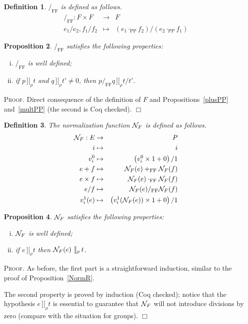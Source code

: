 \documentclass{article}
\newtheorem{definition}{Definition}[section]
\newtheorem{proposition}[definition]{Proposition}
\newenvironment{proof}{\smallskip\textsc{Proof.}}{\hspace*{\fill}$\Box$}
\newcommand{\intII}{\,]\![}
\newcommand{\intrel}{\mathbin{\intII_{\rho}}}
\newcommand{\NF}{\ensuremath{{\cal N}_{F}}}
\newcommand{\multPP}{\ensuremath{\cdot_{\mathrm{PP}}}}
\newcommand{\plusFF}{\ensuremath{+_{\mathrm{FF}}}}
\newcommand{\multFF}{\ensuremath{\cdot_{\mathrm{FF}}}}
\newcommand{\divFF}{\ensuremath{/_{\mathrm{FF}}}}
\begin{document}
\begin{definition}\label{defn:divFF} {\divFF} is defined as follows.
\begin{eqnarray*}
\divFF : F\times F & \to & F \\
 e_1/e_2, f_1/f_2 & \mapsto & (e_1\multPP f_2)/(e_2\multPP f_1)
\end{eqnarray*}
\end{definition}

\begin{proposition}\label{divFF}
{\divFF} satisfies the following properties:
\begin{enumerate}[(i)]
\item {\divFF} is well defined;
\item if $p\intrel t$ and $q\intrel t'\neq 0$, then $p\divFF q\intrel t/t'$.
\end{enumerate}
\end{proposition}
\begin{proof}
Direct consequence of the definition of $F$ and Propositions~\ref{plusPP}
and~\ref{multPP} (the second is Coq checked).
\end{proof}

\begin{definition}\label{defn:NormF}
The normalization function $\NF$ is defined as follows.
\begin{eqnarray*}
\NF : E & \to & P \\
 i & \mapsto & i \\
 v^0_i & \mapsto & \left(v^0_i\times 1+0\right)/1 \\
 e+f & \mapsto & \NF(e)\plusFF\NF(f) \\
 e\times f& \mapsto & \NF(e)\multFF\NF(f) \\
 e/f& \mapsto & \NF(e)\divFF\NF(f) \\
 v^1_i(e) & \mapsto & \left(v^1_i(\NF(e))\times 1+0\right)/1
\end{eqnarray*}
\end{definition}
\begin{proposition}\label{NormF} {\NF} satisfies the following properties:
\begin{enumerate}[(i)]
\item {\NF} is well defined;
\item\label{NFpresint} if $e\intrel t$ then $\NF(e)\intrel t$.
\end{enumerate}
\end{proposition}
\begin{proof}
As before, the first part is a straightforward induction, similar to the proof
of Proposition~\ref{NormR}.

The second property is proved by induction (Coq checked); notice that the
hypothesis $e\intrel t$ is essential to guarantee that {\NF} will not
introduce divisions by zero (compare with the situation for groups).
\end{proof}
\end{document}
